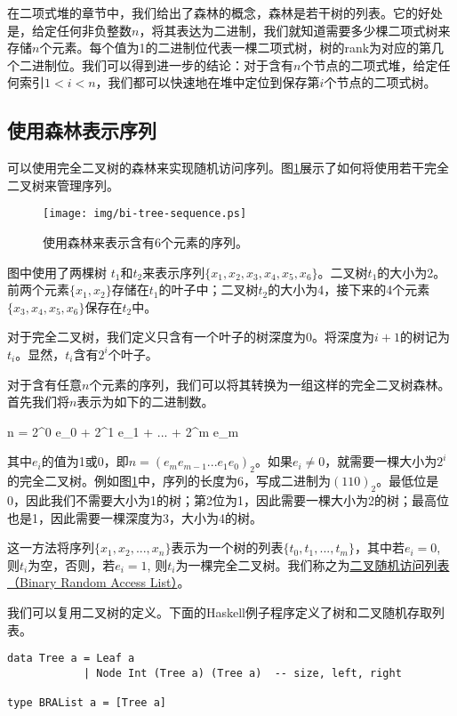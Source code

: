 \documentclass[UTF8]{article}
\begin{document}
在二项式堆的章节中，我们给出了森林的概念，森林是若干树的列表。它的好处是，给定任何非负整数$n$，将其表达为二进制，我们就知道需要多少棵二项式树来存储$n$个元素。每个值为1的二进制位代表一棵二项式树，树的rank为对应的第几个二进制位。我们可以得到进一步的结论：对于含有$n$个节点的二项式堆，给定任何索引$1 < i < n$，我们都可以快速地在堆中定位到保存第$i$个节点的二项式树。

\subsection{使用森林表示序列}

可以使用完全二叉树的森林来实现随机访问序列。图\ref{fig:bi-tree-sequence}展示了如何将使用若干完全二叉树来管理序列。

\begin{figure}[htbp]
  \centering
  \texttt{[image: img/bi-tree-sequence.ps]}
  \caption{使用森林来表示含有6个元素的序列。} \label{fig:bi-tree-sequence}
\end{figure}

图中使用了两棵树 $t_1$和$t_2$来表示序列$\{x_1, x_2, x_3, x_4, x_5, x_6\}$。二叉树$t_1$的大小为2。前两个元素$\{x_1, x_2\}$存储在$t_1$的叶子中；二叉树$t_2$的大小为4，接下来的4个元素$\{x_3, x_4, x_5, x_6\}$保存在$t_2$中。

对于完全二叉树，我们定义只含有一个叶子的树深度为0。将深度为$i+1$的树记为$t_i$。显然，$t_i$含有$2^i$个叶子。

对于含有任意$n$个元素的序列，我们可以将其转换为一组这样的完全二叉树森林。首先我们将$n$表示为如下的二进制数。

\be
n = 2^0 e_0 + 2^1 e_1 + ... + 2^m e_m
\ee

其中$e_i$的值为1或0，即$n=(e_m e_{m-1} ... e_1 e_0)_2$。如果$e_i \neq 0$，就需要一棵大小为$2^i$的完全二叉树。例如图\ref{fig:bi-tree-sequence}中，序列的长度为6，写成二进制为$(110)_2$。最低位是0，因此我们不需要大小为1的树；第2位为1，因此需要一棵大小为2的树；最高位也是1，因此需要一棵深度为3，大小为4的树。

这一方法将序列$\{x_1, x_2, ..., x_n\}$表示为一个树的列表$\{t_0, t_1, ..., t_m\}$，其中若$e_i = 0$, 则$t_i$为空，否则，若$e_i = 1$, 则$t_i$为一棵完全二叉树。我们称之为\underline{二叉随机访问列表（Binary Random Access List）}\cite{okasaki-book}。

我们可以复用二叉树的定义。下面的Haskell例子程序定义了树和二叉随机存取列表。

\lstset{language=Haskell}
\begin{lstlisting}
data Tree a = Leaf a
            | Node Int (Tree a) (Tree a)  -- size, left, right

type BRAList a = [Tree a]
\end{lstlisting}
\end{document}
